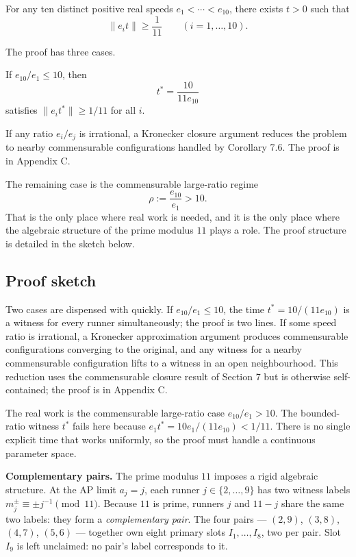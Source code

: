 \documentclass[12pt]{article}
\begin{document}
\begin{theorem}\label{t:11}
For any ten distinct positive real speeds
$e_1<\cdots<e_{10}$, there exists $t>0$ such that
\[
\|e_i t\|\ge \frac{1}{11}\qquad(i=1,\ldots,10).
\]

The proof has three cases.

\end{theorem}
\begin{theorem}\label{t:12}
If $e_{10}/e_1\le 10$, then
\[
t^*=\frac{10}{11e_{10}}
\]
satisfies $\|e_i t^*\|\ge 1/11$ for all $i$.
\end{theorem}

If any ratio $e_i/e_j$ is irrational, a Kronecker closure argument reduces the problem
to nearby commensurable configurations handled by Corollary 7.6. The proof
is in Appendix C.

The remaining case is the commensurable large-ratio regime
\[
\rho := \frac{e_{10}}{e_1} > 10.
\]
That is the only place where real work is needed, and it is the only place where the algebraic
structure of the prime modulus $11$ plays a role. The proof structure is detailed in the sketch below.

\subsection{Proof sketch}

Two cases are dispensed with quickly. If $e_{10}/e_1\le 10$, the time $t^*=10/(11e_{10})$
is a witness for every runner simultaneously; the proof is two lines. If some speed ratio
is irrational, a Kronecker approximation argument produces commensurable configurations
converging to the original, and any witness for a nearby commensurable configuration
lifts to a witness in an open neighbourhood. This reduction uses the commensurable closure
result of Section 7 but is otherwise self-contained; the proof is in Appendix C.

The real work is the commensurable large-ratio case $e_{10}/e_1>10$. The bounded-ratio
witness $t^*$ fails here because $e_1 t^*=10e_1/(11e_{10})<1/11$. There is no single
explicit time that works uniformly, so the proof must handle a continuous parameter space.

\textbf{Complementary pairs.}
The prime modulus $11$ imposes a rigid algebraic structure. At the AP limit $a_j=j$, each
runner $j\in\{2,\ldots,9\}$ has two witness labels $m_j^{\pm}\equiv\pm j^{-1}\pmod{11}$.
Because $11$ is prime, runners $j$ and $11-j$ share the same two labels: they form a
\emph{complementary pair}. The four pairs --- $(2,9)$, $(3,8)$, $(4,7)$, $(5,6)$ --- together
own eight primary slots $I_1,\ldots,I_8$, two per pair. Slot $I_9$ is left unclaimed:
no pair's label corresponds to it.
\end{document}
